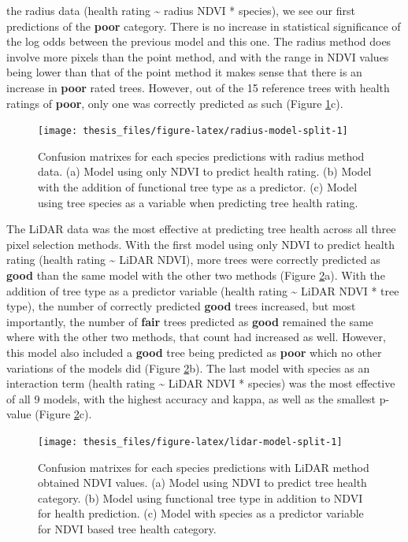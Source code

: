 \documentclass[12pt,twoside]{reedthesis}
\begin{document}
the radius data (health rating \textasciitilde{} radius NDVI * species), we see our
first predictions of the \textbf{poor} category. There is no increase in
statistical significance of the log odds between the previous model and
this one. The radius method does involve more pixels than the point
method, and with the range in NDVI values being lower than that of the
point method it makes sense that there is an increase in \textbf{poor} rated
trees. However, out of the 15 reference trees with health ratings of
\textbf{poor}, only one was correctly predicted as such (Figure
\ref{fig:radius-model-split}c).
\begin{figure}[H]

{\centering \texttt{[image: thesis\_files/figure-latex/radius-model-split-1]} 

}

\caption[Confusion matrixes for Radius method predictive models]{Confusion matrixes for each species predictions with radius method data. (a) Model using only NDVI to predict health rating. (b) Model with the addition of functional tree type as a predictor. (c) Model using tree species as a variable when predicting tree health rating.}\label{fig:radius-model-split}
\end{figure}
The LiDAR data was the most effective at predicting tree health across
all three pixel selection methods. With the first model using only NDVI
to predict health rating (health rating \textasciitilde{} LiDAR NDVI), more trees were
correctly predicted as \textbf{good} than the same model with the other two
methods (Figure \ref{fig:lidar-model-split}a). With the addition of
tree type as a predictor variable (health rating \textasciitilde{} LiDAR NDVI * tree
type), the number of correctly predicted \textbf{good} trees increased, but
most importantly, the number of \textbf{fair} trees predicted as \textbf{good}
remained the same where with the other two methods, that count had
increased as well. However, this model also included a \textbf{good} tree
being predicted as \textbf{poor} which no other variations of the models did
(Figure \ref{fig:lidar-model-split}b). The last model with species as
an interaction term (health rating \textasciitilde{} LiDAR NDVI * species) was the
most effective of all 9 models, with the highest accuracy and kappa, as
well as the smallest p-value (Figure \ref{fig:lidar-model-split}c).
\begin{figure}[H]

{\centering \texttt{[image: thesis\_files/figure-latex/lidar-model-split-1]} 

}

\caption[Confusion matrixes for LiDAR method predictive models]{Confusion matrixes for each species predictions with LiDAR method obtained NDVI values. (a) Model using NDVI to predict tree health category. (b) Model using functional tree type in addition to NDVI for health prediction. (c) Model with species as a predictor variable for NDVI based tree health category.}\label{fig:lidar-model-split}
\end{figure}
\end{document}
